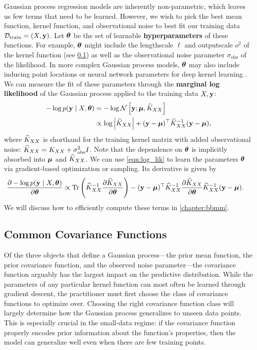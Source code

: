 Gaussian process regression models are inherently non-parametric, which leaves us few terms that need to be learned.
However, we wish to pick the best mean function, kernel function, and observational noise to best fit our training data $\mathcal D_\text{train} = (X, \mathbf{y})$.
Let $\boldsymbol{\theta}$ be the set of learnable {\bf hyperparameters} of these functions.
For example, $\boldsymbol{\theta}$ might include the lengthscale $\ell$ and outputscale $o^2$ of the kernel function (see \cref{sec:common_kernels}) as well as the observational noise parameter $\sigma_\text{obs}$ of the likelihood.
In more complex Gaussian process models, $\boldsymbol{\theta}$ may also include inducing point locations \cite{titsias2009variational} or neural network parameters for deep kernel learning \cite{wilson2016deep}.
We can measure the fit of these parameters through the {\bf marginal log likelihood} of the Gaussian process applied to the training data $X, \mathbf{y}$:
%
\begin{align}
  -\log p( \by \mid \bX, \btheta)
  &= -\log \normaldist{ \by ; \bmu }{ \trainK }
  \nonumber{} \\
  &\propto \log \left \vert \trainK \right \vert + (\by - \bmu)^{\top} \trainK^{-1} (\by - \bmu),
  \label{eqn:log_lik}
\end{align}
%
where $\widehat{K}_{XX}$ is shorthand for the training kernel matrix with added observational noise: $\widehat{K}_{XX} = K_{XX} + \sigma_\text{obs}^2 I$.
Note that the dependence on $\boldsymbol{\theta}$ is implicitly absorbed into $\boldsymbol{\mu}$ and $\widehat{K}_{XX}$.
We can use \cref{eqn:log_lik} to learn the parameters $\boldsymbol{\theta}$ via gradient-based optimization or sampling.
Its derivative is given by
%
\begin{align}
  \frac{\partial - \log p( \by \mid \bX, \btheta )}{\partial \btheta} &\propto
   \tr{\trainK^{-1}\frac{\partial \trainK}{\partial \btheta}} -
	 (\by - \bmu)^{\top} \trainK^{-1}\frac{\partial \trainK}{\partial \btheta}\trainK^{-1} (\by - \bmu).
  \label{eqn:log_lik_deriv}
\end{align}
%
We will discuss how to efficiently compute these terms in \cref{chapter:bbmm}.






\subsection{Common Covariance Functions}
\label{sec:common_kernels}

Of the three objects that define a Gaussian process---the prior mean function, the prior covariance function, and the observed noise parameter---the covariance function arguably has the largest impact on the predictive distribution.
While the parameters of any particular kernel function can most often be learned through gradient descent, the practitioner must first choose the class of covariance functions to optimize over.
Choosing the right covariance function class will largely determine how the Gaussian process generalizes to unseen data points.
This is especially crucial in the small-data regime: if the covariance function properly encodes prior information about the function's properties, then the model can generalize well even when there are few training points.

